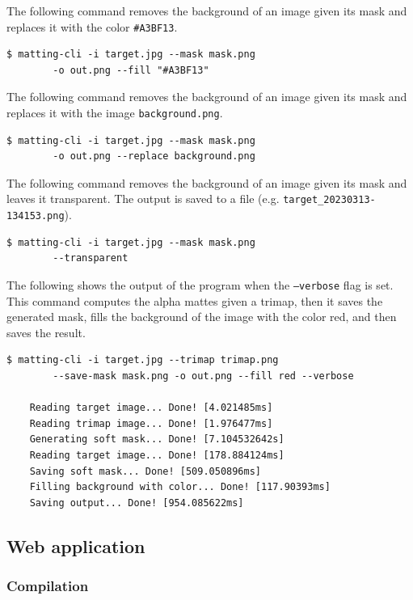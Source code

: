 \documentclass[a4paper]{article}
\begin{document}
The following command removes the background of an image
given its mask and replaces it with the color \texttt{\#A3BF13}.
\begin{lstlisting}[style=boxed]
    $ matting-cli -i target.jpg --mask mask.png
        -o out.png --fill "#A3BF13"
\end{lstlisting}

The following command removes the background of an image
given its mask and replaces it with the image \texttt{background.png}.
\begin{lstlisting}[style=boxed]
    $ matting-cli -i target.jpg --mask mask.png
        -o out.png --replace background.png
\end{lstlisting}

The following command removes the background of an image
given its mask and leaves it transparent. The output is saved to a file
(e.g. \texttt{target\_20230313-134153.png}).
\begin{lstlisting}[style=boxed]
    $ matting-cli -i target.jpg --mask mask.png
        --transparent
\end{lstlisting}

The following shows the output of the program when the \texttt{--verbose}
flag is set. This command computes the alpha mattes given a \gls{trimap},
then it saves the generated mask, fills the background of the image
with the color red, and then saves the result.
\begin{lstlisting}[style=boxed]
    $ matting-cli -i target.jpg --trimap trimap.png
        --save-mask mask.png -o out.png --fill red --verbose
    
    Reading target image... Done! [4.021485ms]
    Reading trimap image... Done! [1.976477ms]
    Generating soft mask... Done! [7.104532642s]
    Reading target image... Done! [178.884124ms]
    Saving soft mask... Done! [509.050896ms]
    Filling background with color... Done! [117.90393ms]
    Saving output... Done! [954.085622ms]
\end{lstlisting}

\pagebreak

\subsection{Web application}

\subsubsection{Compilation}
\end{document}
